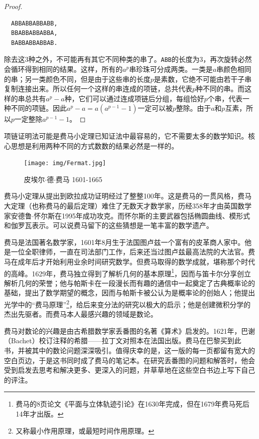 \documentclass[b5paper]{ctexart}
\begin{document}
\begin{proof}
\begin{verbatim}
  ABBABBABBABB,
  BBABBABBABBA,
  BABBABBABBAB.
\end{verbatim}

除去这3种之外，不可能再有其它不同种类的串了。\texttt{ABB}的长度为3，再次旋转必然会循环得到相同的结果。这样，所有的$a^p$串珍珠可分成两类。一类是$a$串颜色相同的串；另一类颜色不同，但是由于这些串的长度$p$是素数，它绝不可能由若干子串复制连接出来。所以任何一个这样的串连成的项链，总共代表$p$种不同的串。而这样的串总共有$a^p - a$种，它们可以通过连成项链后分组，每组恰好$p$个串，代表一种不同的项链。因此$a^p-a = a(a^{p-1}-1)$一定可以被$p$整除。由于$a$和$p$互素，所以$p$一定整除$a^{p-1}-1$。
\end{proof}

项链证明法可能是费马小定理已知证法中最容易的，它不需要太多的数学知识。核心思想是利用两种不同的方式数数的结果必然是一样的。

\begin{figure}
  \centering %
 \texttt{[image: img/Fermat.jpg]}
 \captionsetup{labelformat=empty}
 \caption{皮埃尔$\cdot$德$\cdot$费马 1601-1665}
 \label{fig:Fermat}
\end{figure}

费马小定理从提出到欧拉成功证明经过了整整100年。这是费马的一贯风格，费马大定理（也称费马的最后定理）难住了无数天才数学家，历经358年才由英国数学家安德鲁$\cdot$怀尔斯在1995年成功攻克。而怀尔斯的主要武器包括椭圆曲线、模形式和伽罗瓦表示\cite{HanXueTao2009}。可以说费马留下的这些猜想是一笔丰富的数学遗产。

\vspace{5mm}

费马是法国著名数学家，1601年8月生于法国图卢兹一个富有的皮革商人家中。他是一位全职律师，一直在司法部门工作，后来还当过图卢兹最高法院的大法官。费马在成年后才开始利用业余时间研究数学。但费马取得的数学成就，堪称那个时代的高峰。1629年，费马独立得到了解析几何的基本原理\footnote{费马的8页论文《平面与立体轨迹引论》在1630年完成，但在1679年费马死后14年才出版。}，因而与笛卡尔分享创立解析几何的荣誉；他与帕斯卡在一段漫长而有趣的通信中一起奠定了古典概率论的基础，提出了数学期望的概念，因而与帕斯卡被公认为是概率论的创始人；他提出光学中的“费马原理”\footnote{又称最小作用原理，或最短时间作用原理。}，给后来变分法的研究以极大的启示；他是创建微积分学的杰出先驱者。而费马本人最感兴趣的领域是数论。

费马对数论的兴趣是由古希腊数学家丢番图的名著《算术》启发的。1621年，巴谢（Bachet）校订注释的希腊——拉丁文对照本在法国出版。费马在巴黎买到此书，并被其中的数论问题深深吸引。值得庆幸的是，这一版的每一页都留有宽大的空白页边，于是这书同时成了费马的笔记本。在研究丢番图的问题和解答时，他会受到启发去思考和解决更多、更深入的问题，并草草地在这些空白书边上写下自己的评注。
\end{document}
